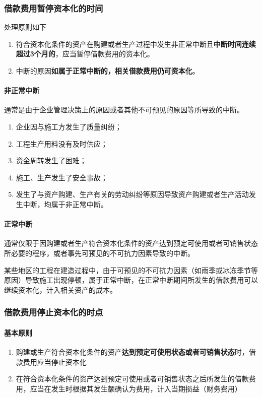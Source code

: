 \documentclass[UTF8,12pt]{ctexart}
\numberwithin{equation}{section} %
\numberwithin{figure}{section}
\numberwithin{table}{section}
\begin{document}
	\subsubsection{借款费用暂停资本化的时间}
	处理原则如下
	\begin{enumerate}
		\item 符合资本化条件的资产在购建或者生产过程中发生非正常中断且\textbf{中断时间连续超过3个月的}，应当暂停借款费用的资本化。
		
		\item 中断的原因\textbf{如属于正常中断的，相关借款费用仍可资本化}。
	\end{enumerate}
	
	\paragraph{非正常中断}通常是由于企业管理决策上的原因或者其他不可预见的原因等所导致的中断。
	\begin{enumerate}
		\item 企业因与施工方发生了质量纠纷；
		
		\item 工程生产用料没有及时供应；
			
		\item 资金周转发生了困难；
		
		\item 施工、生产发生了安全事故；
	
		\item 发生了与资产购建、生产有关的劳动纠纷等原因导致资产购建或者生产活动发生中断，均属于非正常中断。
	\end{enumerate}
	
	
	
	\paragraph{正常中断}通常仅限于因购建或者生产符合资本化条件的资产达到预定可使用或者可销售状态所必要的程序，或者事先可预见的不可抗力因素导致的中断。
	
	某些地区的工程在建造过程中，由于可预见的不可抗力因素（如雨季或冰冻季节等原因）导致施工出现停顿，属于正常中断，在正常中断期间所发生的借款费用可以继续资本化，计入相关资产的成本。
	
	\subsubsection{借款费用停止资本化的时点}
	\paragraph{基本原则}
	\begin{enumerate}
		\item 购建或生产符合资本化条件的资产\textbf{达到预定可使用状态或者可销售状态}时，借款费用应当停止资本化
		
		\item 在符合资本化条件的资产达到预定可使用或者可销售状态之后所发生的借款费用，应当在发生时根据其发生额确认为费用，计入当期损益（财务费用）
	\end{enumerate}
\end{document}
